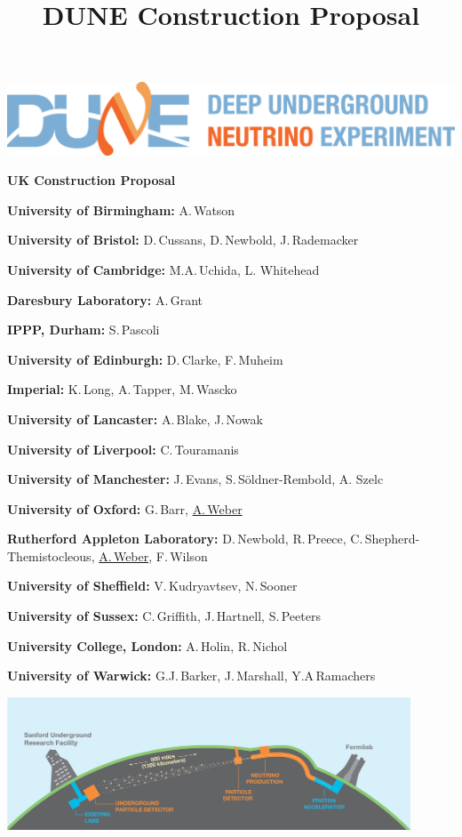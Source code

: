 
\setcounter{page}{0}

\title{DUNE Construction Proposal}

\begin{center}

\includegraphics[width=\textwidth]{figs/dune-horiz-logo-lg.png}
\vspace{1ex}

{\LARGE\bf 
UK Construction Proposal
}
\vfill

{\bf University of Birmingham:} A.\,Watson

{\bf University of Bristol:} D.\,Cussans, D.\,Newbold, J.\,Rademacker

{\bf University of Cambridge:} M.A.\,Uchida, L. Whitehead

{\bf Daresbury Laboratory:} A.\,Grant

{\bf IPPP, Durham:} S.\,Pascoli

{\bf University of Edinburgh:} D.\,Clarke, F.\,Muheim

{\bf Imperial:} K.\,Long, A.\,Tapper, M.\,Wascko

{\bf University of Lancaster:} A.\,Blake, J.\,Nowak

{\bf University of Liverpool:} C.\,Touramanis

{\bf University of Manchester:} J.\,Evans, S.\,S\"oldner-Rembold, A. Szelc

{\bf University of Oxford:} G.\,Barr, \underline{A.\,Weber}

{\bf Rutherford Appleton Laboratory:} D.\,Newbold, R.\,Preece, C.\,Shepherd-Themistocleous, \underline{A.\,Weber}, F.\,Wilson

{\bf University of Sheffield:} V.\,Kudryavtsev, N.\,Sooner

{\bf University of Sussex:} C.\,Griffith, J.\,Hartnell, S.\,Peeters

{\bf University College, London:} A.\,Holin, R.\,Nichol

{\bf University of Warwick:} G.J.\,Barker, J.\,Marshall, Y.A\,Ramachers

\vfill

\includegraphics[width=0.9\textwidth]{figs/LBNE_Graphic_061615_2016.jpg}
\end{center}
\vfill

